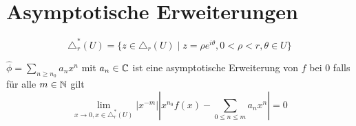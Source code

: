 \chapter{Asymptotische Erweiterungen}
\begin{comment}
  \begin{itemize}
    \item \cite[60]{sabbah_cimpa90} Chapter II.2.2
  \end{itemize}
\end{comment}
\[
\triangle_r^*(U) =
\{z \in \triangle_r(U) \mid z = ρe^{i\theta},0 < ρ < r,\theta \in U\}
\]

\begin{defn}
$\hat\phi=\sum_{n\geq n_0}a_nx^n$ mit $a_n\in\mathbb{C}$ ist eine asymptotische
Erweiterung von $f$ bei $0$ falls für alle $m\in\mathbb{N}$ gilt
\[
\lim_{x\to 0,x\in\triangle_r^*(U)}
\left|x^{-m}\right|\left|x^{n_{0}}f(x)-\sum_{0\leq n\leq m}a_{n}x^{n}\right|
=0
\]
\end{defn}
